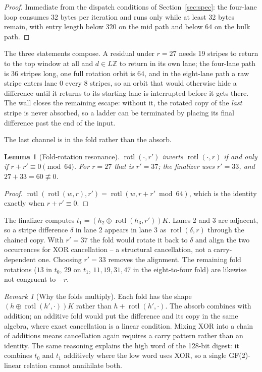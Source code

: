 \documentclass[10pt,a4paper]{article}
\newtheorem{lemma}{Lemma}
\theoremstyle{remark}
\newtheorem{remark}{Remark}
\newcommand{\rotl}{\operatorname{rotl}}
\begin{document}
\begin{proof}
Immediate from the dispatch conditions of Section~\ref{sec:spec}: the
four-lane loop consumes 32 bytes per iteration and runs only while at least
32 bytes remain, with entry length below \(320\) on the mid path and below
\(64\) on the bulk path.
\end{proof}

The three statements compose.  A residual under \(r=27\) needs 19 stripes to
return to the top window at all and \(d \in L\mathbb{Z}\) to return in its own
lane; the four-lane path is 36 stripes long, one full rotation orbit is 64,
and in the eight-lane path a raw stripe enters lane 0 every 8 stripes, so an
orbit that would otherwise hide a difference until it returns to its starting
lane is interrupted before it gets there.  The wall closes the remaining
escape: without it, the rotated copy of the \emph{last} stripe is never
absorbed, so a ladder can be terminated by placing its final difference past
the end of the input.

The last channel is in the fold rather than the absorb.

\begin{lemma}[Fold-rotation resonance]
\label{lem:fold}
\(\rotl(\cdot,r')\) inverts \(\rotl(\cdot,r)\) if and only if
\(r + r' \equiv 0 \pmod{64}\).  For \(r = 27\) that is \(r' = 37\); the
finalizer uses \(r' = 33\), and \(27 + 33 = 60 \not\equiv 0\).
\end{lemma}

\begin{proof}
\(\rotl(\rotl(w,r),r') = \rotl(w,r+r' \bmod 64)\), which is the identity
exactly when \(r+r' \equiv 0\).
\end{proof}

The finalizer computes \(t_1 = (h_2 \oplus \rotl(h_3,r'))K\).  Lanes 2 and 3
are adjacent, so a stripe difference \(\delta\) in lane 2 appears in lane 3
as \(\rotl(\delta,r)\) through the chained copy.  With \(r' = 37\) the fold
would rotate it back to \(\delta\) and align the two occurrences for XOR
cancellation -- a structural cancellation, not a carry-dependent one.
Choosing \(r'=33\) removes the alignment.  The remaining fold rotations
(\(13\) in \(t_0\), \(29\) on \(t_1\), \(11,19,31,47\) in the eight-to-four
fold) are likewise not congruent to \(-r\).

\begin{remark}[Why the folds multiply]
Each fold has the shape \((h \oplus \rotl(h',\cdot))K\) rather than
\(h + \rotl(h',\cdot)\).  The absorb combines with addition; an additive fold
would put the difference and its copy in the same algebra, where exact
cancellation is a linear condition.  Mixing XOR into a chain of additions
means cancellation again requires a carry pattern rather than an identity.
The same reasoning explains the high word of the 128-bit digest: it combines
\(t_0\) and \(t_1\) additively where the low word uses XOR, so a single
GF(2)-linear relation cannot annihilate both.
\end{remark}
\end{document}
